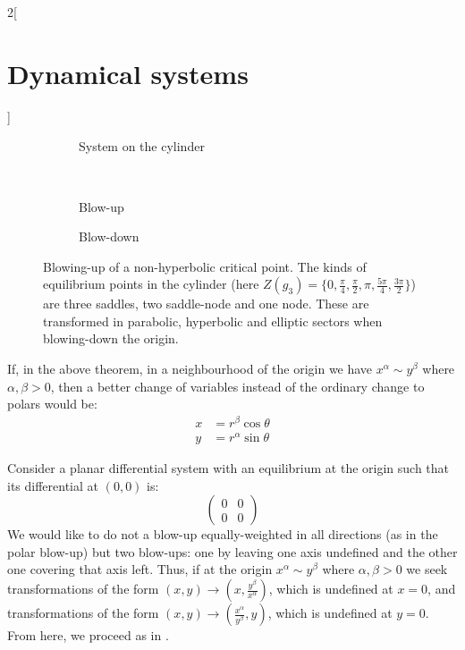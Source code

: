 \documentclass[../../../main_math.tex]{subfiles}
\begin{document}
\begin{multicols}{2}[\section{Dynamical systems}]
\begin{theorem}
  \end{theorem}
  \begin{figure}[H]
    \centering
    \begin{subfigure}[b]{\linewidth}
      \centering
      
      \caption{System on the cylinder}
    \end{subfigure}
    \\
    \begin{subfigure}[b]{0.48\linewidth}
      \centering
      
      \caption{Blow-up}
    \end{subfigure}
    \hfill
    \begin{subfigure}[b]{0.48\linewidth}
      \centering
      
      \caption{Blow-down}
    \end{subfigure}
    \caption{Blowing-up of a non-hyperbolic critical point. The kinds of equilibrium points in the cylinder (here $Z(g_3)=\{0,\frac{\pi}{4},\frac{\pi}{2}, \pi, \frac{5\pi}{4}, \frac{3\pi}{2}\}$) are three saddles, two saddle-node and one node. These are transformed in parabolic, hyperbolic and elliptic sectors when blowing-down the origin.}
    \label{DS:blowup}
  \end{figure}
  \begin{corollary}
    If, in the above theorem, in a neighbourhood of the origin we have $x^\alpha \sim y^\beta$ where $\alpha,\beta>0$, then a better change of variables instead of the ordinary change to polars would be:
    \begin{align*}
      x & =r^\beta\cos\theta  \\
      y & =r^\alpha\sin\theta
    \end{align*}
  \end{corollary}
  \begin{theorem}\label{DS:blowcarte}
    Consider a planar differential system with an equilibrium at the origin such that its differential at $(0,0)$ is:
    $$\begin{pmatrix}
        0 & 0 \\
        0 & 0
      \end{pmatrix}$$
    We would like to do not a blow-up equally-weighted in all directions (as in the polar blow-up) but two blow-ups: one by leaving one axis undefined and the other one covering that axis left. Thus, if at the origin $x^\alpha \sim y^\beta$ where $\alpha,\beta>0$ we seek transformations of the form $(x,y)\rightarrow\left(x,\frac{y^\beta}{x^\alpha}\right)$, which is undefined at $x=0$, and transformations of the form $(x,y)\rightarrow\left(\frac{x^\alpha}{y^\beta},y\right)$, which is undefined at $y=0$. From here, we proceed as in .

\end{theorem}
\end{multicols}
\end{document}
